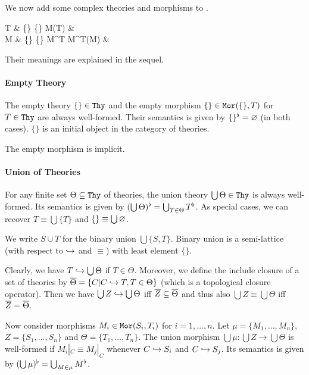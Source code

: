 
We now add some complex theories and morphisms to \mmt.
\begin{grammar}
T      & \{\} \alt \bigcup\{\} \alt M(T)   & \\
M      & \{\} \alt \bigcup\{\} \alt M^T \alt M^T(M)   & 
\end{grammar}

Their meanings are explained in the sequel.

\paragraph{Empty Theory}
The empty theory $\{\}\in\mathtt{Thy}$ and the empty morphism $\{\}\in\mathtt{Mor}(\{\},T)$ for $T\in\mathtt{Thy}$ are always well-formed.
Their semantics is given by $\{\}^\flat=\varnothing$ (in both cases).
$\{\}$ is an initial object in the category of theories.

The empty morphism is implicit.

\paragraph{Union of Theories}
For any finite set $\Theta\subseteq\mathtt{Thy}$ of theories, the union theory $\bigcup \Theta\in\mathtt{Thy}$ is always well-formed.
Its semantics is given by $(\bigcup\Theta)^\flat=\bigcup_{T\in\Theta}T^\flat$.
As special cases, we can recover $T\equiv\bigcup\{T\}$ and $\{\}\equiv\bigcup\varnothing$.

We write $S\cup T$ for the binary union $\bigcup\{S,T\}$.
Binary union is a semi-lattice (with respect to $\hookrightarrow$ and $\equiv$) with least element $\{\}$.

Clearly, we have $T\hookrightarrow \bigcup\Theta$ if $T\in\Theta$.
Moreover, we define the include closure of a set of theories by $\overline{\Theta}=\{C|C\hookrightarrow T, T\in\Theta\}$ (which is a topological closure operator).
Then we have $\bigcup Z\hookrightarrow \bigcup \Theta$ iff $\overline{Z}\subseteq\overline{\Theta}$ and thus also $\bigcup Z\equiv \bigcup \Theta$ iff $\overline{Z}=\overline{\Theta}$.


Now consider morphisms $M_i\in\mathtt{Mor}(S_i,T_i)$ for $i=1,\ldots,n$.
Let $\mu=\{M_1,\ldots,M_n\}$, $Z=\{S_1,\ldots,S_n\}$ and $\Theta=\{T_1,\ldots,T_n\}$.
The union morphism $\bigcup \mu: \bigcup Z \to \bigcup \Theta$ is well-formed if $M_i|_C\equiv M_j|_C$ whenever $C\hookrightarrow S_i$ and $C\hookrightarrow S_j$.
Its semantics is given by $(\bigcup \mu)^\flat=\bigcup_{M\in\mu} M^\flat$.

